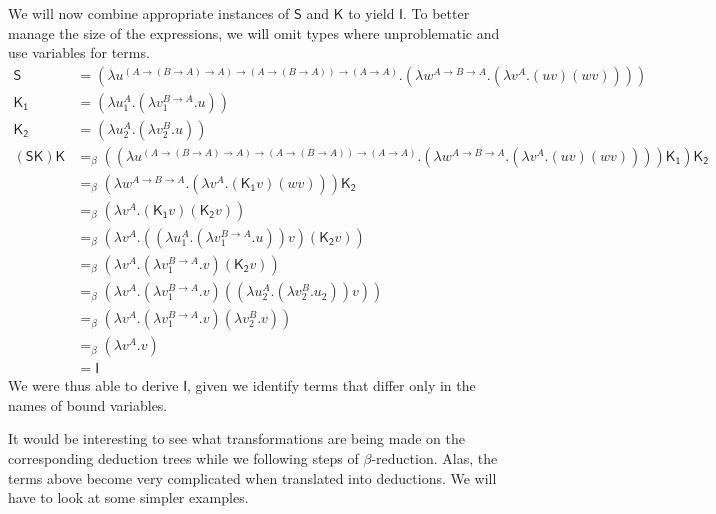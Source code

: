 We will now combine appropriate instances of $\mathsf{S}$ and $\mathsf{K}$ to
yield $\mathsf{I}$. To better manage the size of the expressions, we will omit
types where unproblematic and use variables for terms.
\begin{align*}
\mathsf{S} &=
(\lambda u^{(A \to (B \to A) \to A) \to (A \to (B \to A)) \to (A \to A)}.
  (\lambda w^{A \to B \to A}.
    (\lambda v^A.(uv)(wv))
  )
) \\
\mathsf{K_1} &=
(\lambda u_1^A.
  (\lambda v_1^{B \to A}.u)
) \\
\mathsf{K_2} &=
(\lambda u_2^A.
  (\lambda v_2^B.u)
) \\
\mathsf{(SK)K} &=_\beta
(
  (\lambda u^{(A \to (B \to A) \to A) \to (A \to (B \to A)) \to (A \to A)}.
    (\lambda w^{A \to B \to A}.
      (\lambda v^A.(uv)(wv))
    )
  )
  \mathsf{K_1}
)
\mathsf{K_2} \\
&=_\beta
(\lambda w^{A \to B \to A}.
  (\lambda v^A.(\mathsf{K_1}v)(wv))
)
\mathsf{K_2} \\
&=_\beta
(\lambda v^A.(\mathsf{K_1}v)(\mathsf{K_2}v)) \\
&=_\beta
(\lambda v^A.
  ((\lambda u_1^A.
    (\lambda v_1^{B \to A}.u)
  )v)
  (\mathsf{K_2}v)
) \\
&=_\beta
(\lambda v^A.
  (\lambda v_1^{B \to A}.v)
  (\mathsf{K_2}v)
) \\
&=_\beta
(\lambda v^A.
  (\lambda v_1^{B \to A}.v)
  ((\lambda u_2^A.
     (\lambda v_2^B.u_2)
  )v)
) \\
&=_\beta
(\lambda v^A.
  (\lambda v_1^{B \to A}.v)
  (\lambda v_2^B.v)
) \\
&=_\beta
(\lambda v^A.v) \\
&=
\mathsf{I}
\end{align*}
We were thus able to derive $\mathsf{I}$, given we identify terms that differ only in
the names of bound variables.

It would be interesting to see what transformations are being made on the
corresponding deduction trees while we following steps of $\beta$-reduction.
Alas, the terms above become very complicated when translated into
deductions. We will have to look at some simpler examples.
